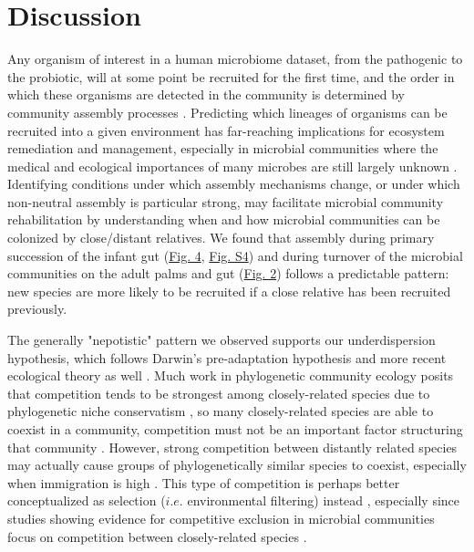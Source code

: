 \documentclass{article}
\begin{document}
\section{Discussion}
Any organism of interest in a human microbiome dataset, from the pathogenic to the probiotic, will at some point be recruited for the first time, and the order in which these organisms are detected 
in the community is determined by community assembly processes \cite{Nemergut2013}. Predicting which lineages of organisms can be recruited into a given environment has far-reaching implications for ecosystem remediation and management, especially in microbial communities where the medical and ecological importances of many microbes are still largely unknown \cite{Martiny2015,Vazquez-Baeza2018}. Identifying conditions under which assembly mechanisms change, or under which non-neutral assembly is particular strong, may facilitate microbial community rehabilitation by understanding when and how microbial communities can be colonized by close/distant relatives. We found that assembly during primary succession of the infant gut (\hyperref[sec:figure4]{Fig. 4}, \hyperref[sec:figureS4]{Fig. S4}) and during turnover of the microbial communities on the adult palms and gut (\hyperref[sec:figure2]{Fig. 2}) follows a predictable pattern: new species are more likely to be recruited if a close relative has been recruited previously.
\par
The generally "nepotistic" pattern we observed supports our underdispersion hypothesis, which follows Darwin's pre-adaptation hypothesis \cite{Darwin1859} and more recent ecological theory as well \cite{DAndrea2019,Mayfield2010}. Much work in phylogenetic community ecology posits that competition tends to be strongest among closely-related species due to phylogenetic niche conservatism \cite{Wiens2010}, so many closely-related species are able to coexist in a community, competition must not be an important factor structuring that community \cite{Webb2002}. However, strong competition between distantly related species may actually cause groups of phylogenetically similar species to coexist, especially when immigration is high \cite{DAndrea2019,Mayfield2010,Scheffer6230}. This type of competition is perhaps better conceptualized as selection (\(i.e.\) environmental filtering) instead \cite{Mayfield2010}, especially since studies showing evidence for competitive exclusion in microbial communities focus on competition between closely-related species \cite{Peay2012,Sprockett2018}. 
\par
\end{document}
